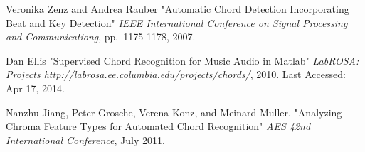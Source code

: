 \documentclass{article}
\begin{document}
\begin{thebibliography}{citations}
Veronika Zenz and Andrea Rauber
"Automatic Chord Detection Incorporating Beat and Key Detection"
{\it IEEE International Conference on Signal Processing and Communicationg},
pp.~1175-1178, 2007.

Dan Ellis
"Supervised Chord Recognition for Music Audio in Matlab"
{\it LabROSA: Projects http://labrosa.ee.columbia.edu/projects/chords/},
2010. Last Accessed: Apr 17, 2014.

Nanzhu Jiang, Peter Grosche, Verena Konz, and Meinard Muller.
"Analyzing Chroma Feature Types for Automated Chord Recognition"
{\it AES 42nd International Conference},
July 2011.

\end{thebibliography}


\end{document}
